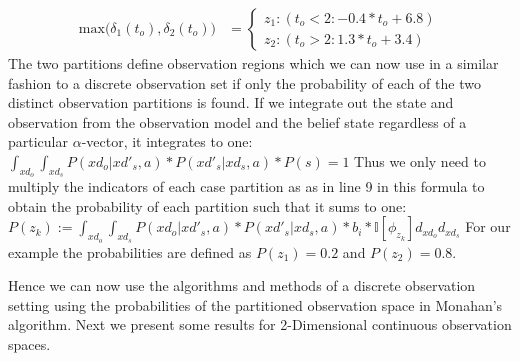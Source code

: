 \documentclass{article} %
\begin{document}
{\footnotesize
\vspace{-2mm}
\begin{align}
\mathrm{max} \Bigg(\delta_{1}(t_o),\delta_{2}(t_o)\Bigg) &= 
\begin{cases}
 z_1:(t_o<2 : -0.4*t_o +6.8) \\
z_2:(t_o>2 : 1.3*t_o +3.4)
\end{cases}
\nonumber
\end{align}
}
The two partitions define observation regions which we can now use in a similar fashion to a discrete observation set if only the probability of each of the two distinct observation partitions is found. If we integrate out the state and observation from the observation model and the belief state regardless of a particular $\alpha$-vector, it integrates to one: 
$\int_{xd_o}\int_{xd_s} P(xd_o|xd'_s,a)*P(xd'_s|xd_s,a)*P(s) = 1$
Thus we only need to multiply the indicators of each case partition as as in line 9 in this formula to obtain the probability of each partition such that it sums to one: 
$P(z_k) := \int_{xd_o}\int_{xd_s} P(xd_o|xd'_s,a)*P(xd'_s|xd_s,a)*b_i* \mathbb{I}[\phi_{z_k}] d_{xd_o} d_{xd_s}$
For our example the probabilities are defined as $P(z_1)=0.2$ and $P(z_2)=0.8$.

Hence we can now use the algorithms and methods of a discrete observation setting using the probabilities of the partitioned observation space in Monahan's algorithm. 
Next we present some results for 2-Dimensional continuous observation spaces.

\end{document}
